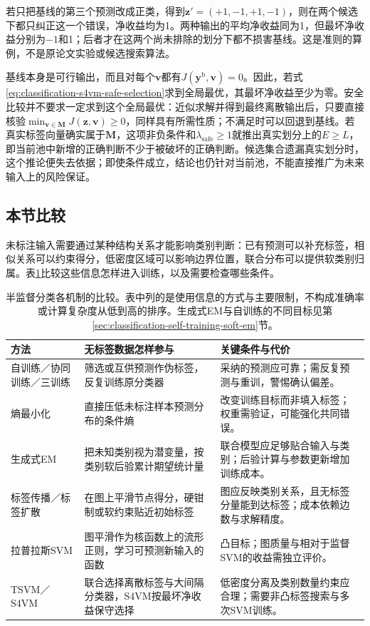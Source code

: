 若只把基线的第三个预测改成正类，得到$\bm z'=(+1,-1,+1,-1)$，则在两个候选下都只纠正这一个错误，净收益均为1。两种输出的平均净收益同为1，但最坏净收益分别为$-1$和1；后者才在这两个尚未排除的划分下都不损害基线。这是准则的算例，不是原论文实验或候选搜索算法。

基线本身是可行输出，而且对每个$\bm v$都有$J(\bm y^{\mathrm b},\bm v)=0$。因此，若式\eqref{eq:classification-s4vm-safe-selection}求到全局最优，其最坏净收益至少为零。安全比较并不要求一定求到这个全局最优：近似求解并得到最终离散输出后，只要直接核验$\min_{\bm v\in\bm M}J(\bm z,\bm v)\geq0$，同样具有所需性质；不满足时可以回退到基线。若真实标签向量确实属于$\bm M$，这项非负条件和$\lambda_{\mathrm{safe}}\geq1$就推出真实划分上的$E\geq L$，即当前池中新增的正确判断不少于被破坏的正确判断。候选集合遗漏真实划分时，这个推论便失去依据；即使条件成立，结论也仍针对当前池，不能直接推广为未来输入上的风险保证。

\subsection{本节比较}
\label{sec:classification-semisupervised-comparison}

未标注输入需要通过某种结构关系才能影响类别判断：已有预测可以补充标签，相似关系可以约束得分，低密度区域可以影响边界位置，联合分布可以提供软类别归属。表\ref{tab:classification-semisupervised-comparison}比较这些信息怎样进入训练，以及需要检查哪些条件。

\begin{table}[htbp]
  \centering
  \small
  \begin{tabularx}{\linewidth}{@{}>{\RaggedRight\arraybackslash}p{25mm}>{\RaggedRight\arraybackslash}X>{\RaggedRight\arraybackslash}X@{}}
    \toprule
    方法 & 无标签数据怎样参与 & 关键条件与代价 \\
    \midrule
    自训练／协同训练／三训练 & 筛选或互供预测作伪标签，反复训练原分类器 & 采纳的预测应可靠；需反复预测与重训，警惕确认偏差。 \\
    熵最小化 & 直接压低未标注样本预测分布的条件熵 & 改变训练目标而非填入标签；权重需验证，可能强化共同错误。 \\
    生成式EM & 把未知类别视为潜变量，按类别软后验累计期望统计量 & 联合模型应足够贴合输入与类别；后验计算与参数更新增加训练成本。 \\
    标签传播／标签扩散 & 在图上平滑节点得分，硬钳制或软约束贴近初始标签 & 图应反映类别关系，且无标签分量能到达标签；成本依赖边数与求解精度。 \\
    拉普拉斯SVM & 图平滑作为核函数上的流形正则，学习可预测新输入的函数 & 凸目标；图质量与相对于监督SVM的收益需独立评价。 \\
    TSVM／S4VM & 联合选择离散标签与大间隔分类器，S4VM按最坏净收益保守选择 & 低密度分离及类别数量约束应合理；需要非凸标签搜索与多次SVM训练。 \\
    \bottomrule
  \end{tabularx}
  \caption{半监督分类各机制的比较。表中列的是使用信息的方式与主要限制，不构成准确率或计算复杂度从低到高的排序。生成式EM与自训练的不同目标见第\ref{sec:classification-self-training-soft-em}节。}
  \label{tab:classification-semisupervised-comparison}
\end{table}


